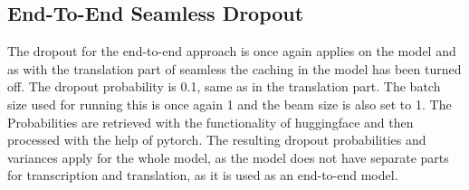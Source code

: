 \subsection{End-To-End Seamless Dropout}
The dropout for the end-to-end approach is once again applies on the model and as with the translation part of seamless the caching in the model has been turned off. 
The dropout probability is 0.1, same as in the translation part. 
The batch size used for running this is once again 1 and the beam size is also set to 1. 
The Probabilities are retrieved with the functionality of huggingface and then processed with the help of pytorch.
The resulting dropout probabilities and variances apply for the whole model, as the model does not have separate parts for transcription and translation, as it is used as an end-to-end model. 


